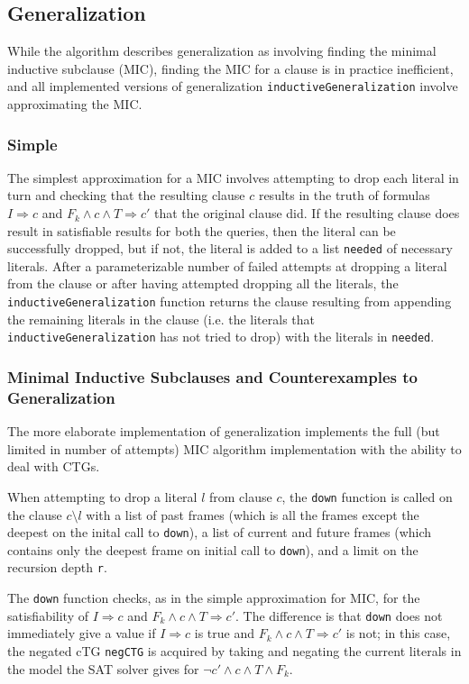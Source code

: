 \documentclass[12pt,a4paper,twoside,openright]{report}
\begin{document}
\subsection{Generalization}
While the algorithm describes generalization as involving finding the minimal inductive subclause (MIC),
finding the MIC for a clause is in practice inefficient, and all implemented versions of generalization
\verb,inductiveGeneralization, involve approximating the MIC.

\subsubsection{Simple}
The simplest approximation for a MIC involves attempting to drop each literal in turn and checking
that the resulting clause $c$ results in the truth of formulas $I \Rightarrow c$ and
$F_k \wedge c \wedge T \Rightarrow c'$ that the original clause did. If the resulting clause
does result in satisfiable results for both the queries, then the literal can be successfully dropped,
but if not, the literal is added to a list \verb,needed, of necessary literals.
After a parameterizable number of failed attempts at dropping a literal from the clause or after
having attempted dropping all the literals, the
\verb,inductiveGeneralization, function returns the clause resulting from appending the remaining
literals in the clause (i.e. the literals that \verb,inductiveGeneralization, has not tried to drop)
with the literals in \verb,needed,.

\subsubsection{Minimal Inductive Subclauses and Counterexamples to Generalization}
The more elaborate implementation of generalization implements the full
(but limited in number of attempts) MIC algorithm implementation with the ability to deal with CTGs.

When attempting to drop a literal $l$ from clause $c$, the \verb,down, function is called on the clause
$c \setminus l$ with a list of past frames (which is all the frames except the deepest on the inital call
to \verb,down,), a list of current and future frames (which contains only the deepest frame on initial call
to \verb,down,), and a limit on the recursion depth \verb,r,.

The \verb,down, function checks, as in the simple approximation for MIC, for the satisfiability of
$I \Rightarrow c$ and $F_k \wedge c \wedge T \Rightarrow c'$. The difference is that \verb,down,
does not immediately give a value if $I \Rightarrow c$ is true and $F_k \wedge c \wedge T \Rightarrow c'$ is
not; in this case, the negated cTG \verb,negCTG, is acquired by taking and negating the current literals in
the model the SAT solver gives for $\neg c' \wedge c \wedge T \wedge F_k$.
\end{document}
